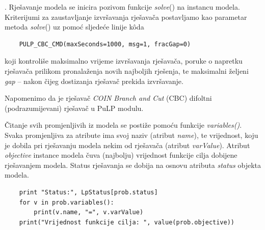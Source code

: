 \documentclass[b5paper, utf8, 11pt, colorlinks]{book}
\theoremstyle{definition}
\begin{document}
 . Rješavanje modela se inicira pozivom funkcije \emph{solve}() na instancu modela. Kriterijumi za zaustavljanje izvršavanja rješavača postavljamo kao parametar metoda \emph{solve}()  uz pomoć sljedeće linije k\^oda
 \begin{verbatim}
    PULP_CBC_CMD(maxSeconds=1000, msg=1, fracGap=0) 
\end{verbatim}
koji kontroliše maksimalno vrijeme izvršavanja rješavača, poruke o napretku rješavača prilikom pronalaženja novih najboljih rješenja, te maksimalni željeni \emph{gap} -- nakon čijeg dostizanja rješavač prekida izvršavanje.

 Napomenimo da je rješavač \emph{COIN Branch and Cut} (CBC) difoltni (podrazumijevani)  rješavač u PuLP modulu. 

 Čitanje svih promjenljivih iz modela se postiže pomoću funkcije \emph{variables()}. Svaka promjenljiva za atribute ima svoj naziv (atribut \emph{name}), te vrijednost, koju je dobila pri rješavanju modela nekim od rješavača (atribut \emph{varValue}). Atribut \emph{objective} instance modela čuva (najbolju) vrijednost funkcije cilja dobijene rješavanjem modela. Status rješavanja se dobija na osnovu atributa \emph{status} objekta modela. 
 \begin{verbatim}
 	print "Status:", LpStatus[prob.status]
 	for v in prob.variables():
 	    print(v.name, "=", v.varValue)
 	print("Vrijednost funkcije cilja: ", value(prob.objective))
  
 \end{verbatim}
\end{document}
